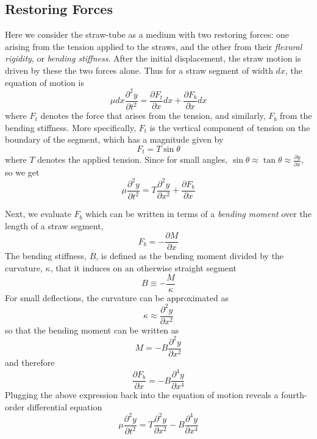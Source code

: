 \documentclass[twoside]{article}
\begin{document}
\begin{multicols}{2} %



\section{Restoring Forces}
Here we consider the straw-tube as a medium with two restoring forces: one arising from the tension applied to the straws, and the other from their \emph{flexural rigidity}, or \emph{bending stiffness}.  After the initial displacement, the straw motion is driven by these the two forces alone. Thus for a straw segment of width $dx$, the equation of motion is
\begin{equation}
\mu dx \frac{\partial^2y}{\partial t^2}  = \frac{\partial F_t}{\partial x}dx + \frac{\partial F_b}{\partial x}dx 
\end{equation}
where $F_t$ denotes the force that arises from the tension, and similarly, $F_b$ from the bending stiffness. More specifically, $F_t$ is the vertical component of tension on the boundary of the segment, which has a magnitude given by
\begin{equation}
F_t = T \sin\theta 
\end{equation}
where $T$ denotes the applied tension. Since for small angles, $\sin\theta \approx \tan\theta \approx \frac{\partial y}{\partial x}$, so we get
\begin{equation}
\mu \frac{\partial ^2y}{\partial t^2}  =  T\frac{\partial^2 y}{\partial x^2} + \frac{\partial F_b}{\partial x} 
\end{equation}


Next, we evaluate $F_b$ which can be written in terms of a \emph{bending moment} over the length of a straw segment,
\begin{equation}
F_b  = -\frac{\partial M}{\partial x} 
\end{equation}
The bending stiffness, $B$, is defined as the bending moment divided by the curvature, $\kappa$, that it induces on an otherwise straight segment
\begin{equation}
 B \equiv -\frac{M}{\kappa}
\end{equation}
For small deflections, the curvature can be approximated as
\begin{equation}
\kappa \approx \frac{\partial^2y}{\partial x^2}
\end{equation}
so that the bending moment can be written as
\begin{equation}
M = - B \frac{\partial^2y}{\partial x^2}
\end{equation}
and therefore
\begin{equation}
	\frac{\partial F_b}{\partial x} =  -B \frac{\partial^4y}{\partial x^4}
\end{equation}
Plugging the above expression back into the equation of motion reveals a fourth-order differential equation
\begin{equation}
\boxed{
\mu \frac{\partial^2y}{\partial t^2} = T \frac{\partial^2y}{\partial x^2} - B \frac{\partial^4y}{\partial x^4}
\label{eq:it}
}
\end{equation}


\end{multicols}
\end{document}
